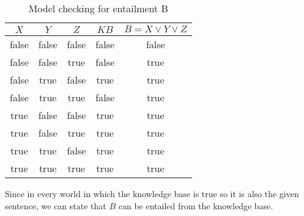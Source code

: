 \documentclass[letterpaper,headings=standardclasses]{scrartcl}
\begin{document}
\begin{table}[h]
    \centering
    \begin{tabular}{|c|c|c|c|c|}
    \hline
    $X$ & $Y$ & $Z$ & $KB$ & $B = X \vee Y \vee Z$ \\ \hline
    false & false & false & false & false \\ \hline
    false & false & true & false & true \\ \hline
    false & true & false & true & true \\ \hline
    false & true & true & false & true \\ \hline
    true & false & false & true & true \\ \hline
    true & false & true & true & true \\ \hline
    true & true & false & true & true \\ \hline
    true & true & true & true & true \\ \hline
    \end{tabular}
    \caption{Model checking for entailment B}
    \label{tt_b}
\end{table}

Since in every world in which the knowledge base is true so it is also the given sentence, we can state that $B$ can be entailed from the knowledge base.
\end{document}
